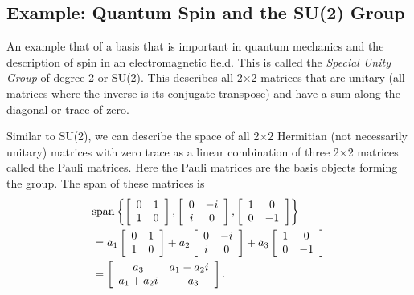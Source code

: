 \subsection{Example: Quantum Spin and the SU(2) Group}

An example that of a basis that is important in quantum mechanics and the description of spin in an electromagnetic field. This is called the \emph{Special Unity Group} of degree 2 or SU(2). This describes all 2$\times$2 matrices that are unitary (all matrices where the inverse is its conjugate transpose) and have a sum along the diagonal or trace of zero. 

Similar to SU(2), we can describe the space of all 2$\times$2 Hermitian (not necessarily unitary) matrices with zero trace as a linear combination of three 2$\times$2 matrices called the Pauli matrices. Here the Pauli matrices are the basis objects forming the group. The span of these matrices is
\begin{align}
  &\text{span} \left\{ 
    \left[ \begin{array}{c c} 
      0 & 1 \\ 
      1 & 0 \\ \end{array} \right] ,
    \left[ \begin{array}{c c} 
      0 & -i \\ 
      i & 0 \\ \end{array} \right] ,
    \left[ \begin{array}{c c} 
      1 &  0 \\ 
      0 & -1 \\ \end{array} \right] \right\} \nonumber \\
 &= a_1     \left[ \begin{array}{c c} 
      0 & 1 \\ 
      1 & 0 \\ \end{array} \right] 
  + a_2     \left[ \begin{array}{c c} 
      0 & -i \\ 
      i & 0 \\ \end{array} \right]
  + a_3    \left[ \begin{array}{c c} 
      1 &  0 \\ 
      0 & -1 \\ \end{array} \right] \nonumber \\
 &= \left[ \begin{array}{c c} 
      a_3 			&  a_1 - a_2 i \\ 
      a_1 + a_2 i 	& -a_3 			\\ \end{array} \right] .
\end{align}
